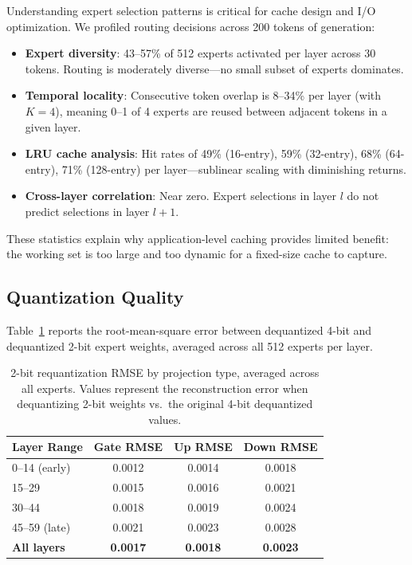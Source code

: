 \documentclass[11pt,twocolumn]{article}
\begin{document}
Understanding expert selection patterns is critical for cache design and I/O optimization.
We profiled routing decisions across 200 tokens of generation:

\begin{itemize}[leftmargin=*,itemsep=2pt]
    \item \textbf{Expert diversity}: 43--57\% of 512 experts activated per layer across 30 tokens. Routing is moderately diverse---no small subset of experts dominates.
    \item \textbf{Temporal locality}: Consecutive token overlap is 8--34\% per layer (with $K=4$), meaning 0--1 of 4 experts are reused between adjacent tokens in a given layer.
    \item \textbf{LRU cache analysis}: Hit rates of 49\% (16-entry), 59\% (32-entry), 68\% (64-entry), 71\% (128-entry) per layer---sublinear scaling with diminishing returns.
    \item \textbf{Cross-layer correlation}: Near zero. Expert selections in layer $l$ do not predict selections in layer $l+1$.
\end{itemize}

These statistics explain why application-level caching provides limited benefit: the working set is too large and too dynamic for a fixed-size cache to capture.

\subsection{Quantization Quality}
\label{sec:quality}

Table~\ref{tab:rmse} reports the root-mean-square error between dequantized 4-bit and dequantized 2-bit expert weights, averaged across all 512 experts per layer.

\begin{table}[h!]
\centering
\small
\caption{2-bit requantization RMSE by projection type, averaged across all experts. Values represent the reconstruction error when dequantizing 2-bit weights vs.\ the original 4-bit dequantized values.}
\label{tab:rmse}
\begin{tabular}{@{}lccc@{}}
\toprule
\textbf{Layer Range} & \textbf{Gate RMSE} & \textbf{Up RMSE} & \textbf{Down RMSE} \\
\midrule
0--14 (early) & 0.0012 & 0.0014 & 0.0018 \\
15--29 & 0.0015 & 0.0016 & 0.0021 \\
30--44 & 0.0018 & 0.0019 & 0.0024 \\
45--59 (late) & 0.0021 & 0.0023 & 0.0028 \\
\midrule
\textbf{All layers} & \textbf{0.0017} & \textbf{0.0018} & \textbf{0.0023} \\
\bottomrule
\end{tabular}
\end{table}
\end{document}
